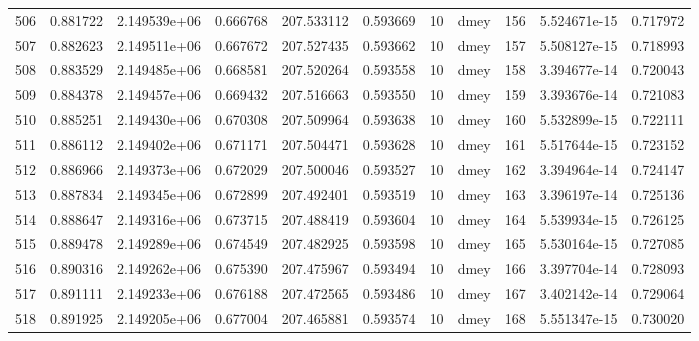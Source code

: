 \begin{tabular}{lrrrrrrlrrr}
506  &    0.881722 &        2.149539e+06 &  0.666768 &              207.533112 &    0.593669 &      10 &         dmey &    156 &   5.524671e-15 &      0.717972 \\
507  &    0.882623 &        2.149511e+06 &  0.667672 &              207.527435 &    0.593662 &      10 &         dmey &    157 &   5.508127e-15 &      0.718993 \\
508  &    0.883529 &        2.149485e+06 &  0.668581 &              207.520264 &    0.593558 &      10 &         dmey &    158 &   3.394677e-14 &      0.720043 \\
509  &    0.884378 &        2.149457e+06 &  0.669432 &              207.516663 &    0.593550 &      10 &         dmey &    159 &   3.393676e-14 &      0.721083 \\
510  &    0.885251 &        2.149430e+06 &  0.670308 &              207.509964 &    0.593638 &      10 &         dmey &    160 &   5.532899e-15 &      0.722111 \\
511  &    0.886112 &        2.149402e+06 &  0.671171 &              207.504471 &    0.593628 &      10 &         dmey &    161 &   5.517644e-15 &      0.723152 \\
512  &    0.886966 &        2.149373e+06 &  0.672029 &              207.500046 &    0.593527 &      10 &         dmey &    162 &   3.394964e-14 &      0.724147 \\
513  &    0.887834 &        2.149345e+06 &  0.672899 &              207.492401 &    0.593519 &      10 &         dmey &    163 &   3.396197e-14 &      0.725136 \\
514  &    0.888647 &        2.149316e+06 &  0.673715 &              207.488419 &    0.593604 &      10 &         dmey &    164 &   5.539934e-15 &      0.726125 \\
515  &    0.889478 &        2.149289e+06 &  0.674549 &              207.482925 &    0.593598 &      10 &         dmey &    165 &   5.530164e-15 &      0.727085 \\
516  &    0.890316 &        2.149262e+06 &  0.675390 &              207.475967 &    0.593494 &      10 &         dmey &    166 &   3.397704e-14 &      0.728093 \\
517  &    0.891111 &        2.149233e+06 &  0.676188 &              207.472565 &    0.593486 &      10 &         dmey &    167 &   3.402142e-14 &      0.729064 \\
518  &    0.891925 &        2.149205e+06 &  0.677004 &              207.465881 &    0.593574 &      10 &         dmey &    168 &   5.551347e-15 &      0.730020 \\

\end{tabular}
